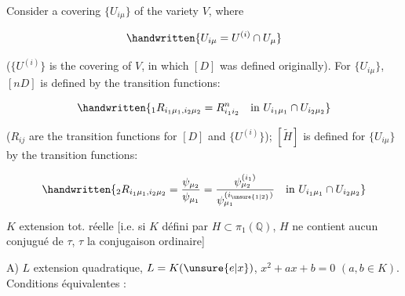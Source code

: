 Consider a covering $\{U_{i\mu}\}$ of the variety $V$, where

\[
\handwritten{U_{i\mu}=U^{(i)}\cap  U_\mu}
\]

($\{U^{(i)}\}$ is the covering of $V$, in which $[D]$ was defined
originally). For $\{U_{i\mu}\}$, $[nD]$ is defined by the transition
functions:

\[
\handwritten{{}_1R_{i_1\mu_1,i_2\mu_2}=R^n_{i_1i_2}\quad\text{in }U_{i_1\mu_1}\cap  U_{i_2\mu_2}}
\]

($R_{ij}$ are the transition functions for $[D]$ and $\{U^{(i)}\}$);
$[\tilde H]$ is defined for $\{U_{i\mu}\}$ by the transition functions:

\[
\handwritten{{}_2R_{i_1\mu_1,i_2\mu_2}=\frac{\psi_{\mu_2}}{\psi_{\mu_1}}=\frac{\psi_{\mu_2}^{(i_1)}}{\psi_{\mu_1}^{(i_{\unsure{1|2}})}}\quad\text{in }U_{i_1\mu_1}\cap  U_{i_2\mu_2}}
\]



$K$ extension tot. réelle [i.e. si $K$ défini par $H\subset\pi_1(\mathbb Q)$, $H$
ne contient aucun conjugué de $\tau$,
$\tau$ la conjugaison ordinaire]

A) $L$ extension quadratique, $L=K(\unsure{e|x})$, $x^2+ax+b=0$ \quad$(a,b\in K)$.
Conditions équivalentes :


